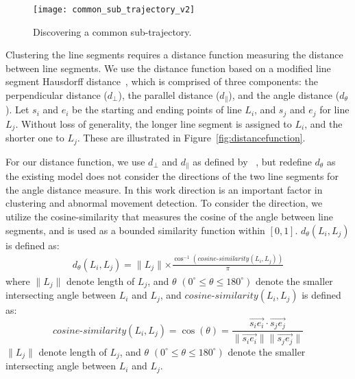 \begin{figure}[tb]
	\centering
	\texttt{[image: common\_sub\_trajectory\_v2]}
	\caption{Discovering a common sub-trajectory.}
	\label{fig:common_sub_trajectory}
\end{figure}

Clustering the line segments requires a distance function measuring the distance between line segments.
We use the distance function based on a modified line segment Hausdorff distance~\cite{Chen:2003:Noisy}, which is comprised of three components: the perpendicular distance ($d_\bot$), the parallel distance ($d_\parallel$), and the angle distance ($d_\theta$).
Let $s_i$ and $e_i$ be the starting and ending points of line $L_i$, and $s_j$ and $e_j$ for line $L_j$.
Without loss of generality, the longer line segment is assigned to $L_i$, and the shorter one to $L_j$.
These are illustrated in Figure~\ref{fig:distancefunction}.

For our distance function, we use $d_\bot$ and $d_\parallel$ as defined by ~\cite{Chen:2003:Noisy}, but redefine $d_\theta$ as the existing model does not consider the directions of the two line segments for the angle distance measure.
In this work direction is an important factor in clustering and abnormal movement detection.
To consider the direction, we utilize the cosine-similarity that measures the cosine of the angle between line segments, and is used as a bounded similarity function within $[0,1]$. 
$d_\theta(L_i, L_j)$ is defined as:
\begin{equation}
\begin{aligned}
d_\theta(L_i, L_j) = \parallel L_j \parallel \times \frac{\cos^{-1} (\mathit{cosine\mbox{-}similarity}(L_i, L_j))} {\pi}
\end{aligned}
\end{equation}
where $\parallel L_j \parallel$ denote length of $L_j$, and $\theta$ $(0^{\circ} \le \theta \le 180^{\circ})$ denote the smaller intersecting angle between $L_i$ and $L_j$, and $\mathit{cosine\mbox{-}similarity}(L_i, L_j)$ is defined as:
\begin{equation}
\mathit{cosine\mbox{-}similarity}(L_i, L_j) = \cos (\theta) = 
\frac{\overrightarrow{s_i e_i} \cdot \overrightarrow{s_j e_j} } {\parallel \overrightarrow{s_i e_i} \parallel \parallel \overrightarrow{s_j e_j} \parallel}	
\end{equation}
$\parallel L_j \parallel$ denote length of $L_j$, and $\theta$ $(0^{\circ} \le \theta \le 180^{\circ})$ denote the smaller intersecting angle between $L_i$ and $L_j$.


